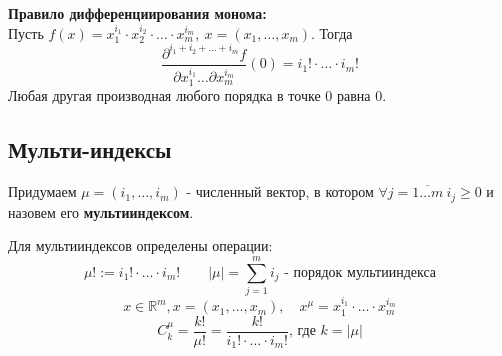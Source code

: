 \textbf{Правило дифференциирования монома:\\}
\bigskip
Пусть $f(x)  = x_1^{i_1} \cdot x_2^{i_2} \cdot \dots \cdot x_m^{i_m}, \ x = (x_1, \dots, x_m)$. Тогда 
\[\frac{\partial^{i_1+i_2+ \dots + i_m} f}{\partial x_1^{i_1} \dots \partial x_m^{i_m}}(0) = i_1! \cdot \hdots \cdot i_m!\]
Любая другая производная любого порядка в точке $0$ равна $0$.

\subsection{Мульти-индексы}
Придумаем $\mu = (i_1, \hdots, i_m)$ - численный вектор, в котором $\forall j = \overline{1 \hdots m} \ i_j \geq 0$ и назовем его \textbf{мультииндексом}.
\par
Для мультииндексов определены операции:
\[\mu! := i_1! \cdot \hdots \cdot  i_m! \qquad \left| \mu \right| = \sum_{j = 1}^{m} i_j \text{ - порядок мультииндекса}\]
\[x \in \mathbb{R}^m, x = (x_1, \hdots, x_m), \quad x^{\mu} = x_1^{i_1} \cdot \hdots \cdot x_m^{i_m}\]
\[C^{\mu}_k = \frac{k!}{\mu!} = \frac{k!}{i_1!\cdot \hdots \cdot i_m!} \text{, где } k = \left|\mu\right|\]
